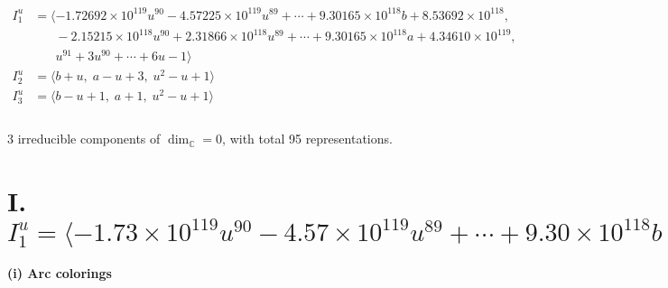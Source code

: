 \documentclass[1p]{elsarticle_modified}
\theoremstyle{definition}
\begin{document}
\begin{align*}
I^u_{1}&=\langle 
-1.72692\times10^{119} u^{90}-4.57225\times10^{119} u^{89}+\cdots+9.30165\times10^{118} b+8.53692\times10^{118},\\
\phantom{I^u_{1}}&\phantom{= \langle  }-2.15215\times10^{118} u^{90}+2.31866\times10^{118} u^{89}+\cdots+9.30165\times10^{118} a+4.34610\times10^{119},\\
\phantom{I^u_{1}}&\phantom{= \langle  }u^{91}+3 u^{90}+\cdots+6 u-1\rangle \\
I^u_{2}&=\langle 
b+u,\;a- u+3,\;u^2- u+1\rangle \\
I^u_{3}&=\langle 
b- u+1,\;a+1,\;u^2- u+1\rangle \\
\\
\end{align*}
\raggedright * 3 irreducible components of $\dim_{\mathbb{C}}=0$, with total 95 representations.\\
\newpage
\renewcommand{\arraystretch}{1}
\centering \section*{I. $I^u_{1}= \langle -1.73\times10^{119} u^{90}-4.57\times10^{119} u^{89}+\cdots+9.30\times10^{118} b+8.54\times10^{118},\;-2.15\times10^{118} u^{90}+2.32\times10^{118} u^{89}+\cdots+9.30\times10^{118} a+4.35\times10^{119},\;u^{91}+3 u^{90}+\cdots+6 u-1 \rangle$}
\flushleft \textbf{(i) Arc colorings}\\
\end{document}
